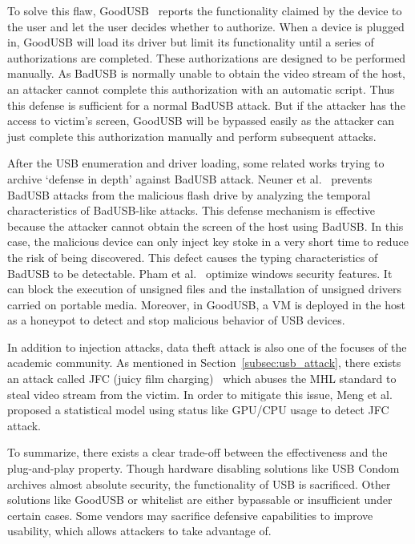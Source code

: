 To solve this flaw, GoodUSB~\cite{tian2015defending} reports the functionality claimed
by the device to the user and let the user decides whether to authorize. When a device
is plugged in, GoodUSB will load its driver but limit its functionality until a
series of authorizations are completed. These authorizations are designed to be
performed manually. As BadUSB is normally unable to obtain the video stream of
the host, an attacker cannot complete this authorization with
an automatic script. Thus this defense is sufficient for a normal BadUSB attack. But
if the attacker has the access to victim's screen, GoodUSB will be bypassed
easily as the attacker can just complete this authorization manually and
perform subsequent attacks.

After the USB enumeration and driver loading, some related works
trying to archive `defense in depth'
against BadUSB attack.  Neuner et 
al.~\cite{neuner2018usblock}
prevents BadUSB attacks from the malicious flash drive by analyzing
the temporal characteristics of BadUSB-like attacks. This defense mechanism is
effective because the attacker cannot obtain the screen of the host using
BadUSB. In this case, the malicious device can only inject key stoke in a very
short time to reduce the risk of being discovered. This defect causes the
typing characteristics of BadUSB to be detectable. Pham et
al.~\cite{pham2010optimizing} optimize windows security features. It can
block the execution of unsigned files and the installation of unsigned drivers
carried on portable media. Moreover, in GoodUSB, a VM is deployed in the host as
a honeypot to detect and stop malicious behavior of USB devices.

In addition to injection attacks, data theft attack is also one of the focuses
of the academic community. As mentioned in Section~\ref{subsec:usb_attack}, there
exists an attack called JFC (juicy film charging)~\cite{JFC} which abuses the MHL
standard to steal video stream from the victim. In order to mitigate this
issue, Meng et al.~\cite{meng2018252} proposed a statistical model using status
like GPU/CPU usage to detect JFC attack.

To summarize, there exists a clear trade-off between the effectiveness and the
plug-and-play property. Though hardware disabling solutions like USB Condom
archives almost absolute security, the functionality of USB is sacrificed.
Other solutions like GoodUSB or whitelist are either bypassable or insufficient
under certain cases.  Some vendors may sacrifice defensive capabilities to
improve usability, which allows attackers to take advantage of.

